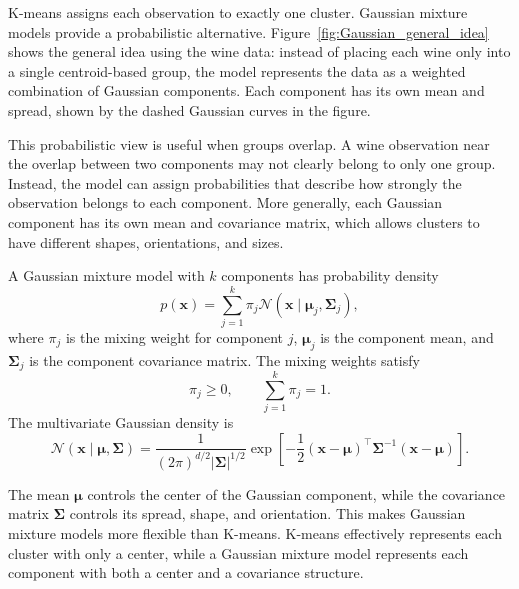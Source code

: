 \documentclass[12pt,letter]{article}
\begin{document}
K-means assigns each observation to exactly one cluster. Gaussian mixture models provide a probabilistic alternative. Figure~\ref{fig:Gaussian_general_idea} shows the general idea using the wine data: instead of placing each wine only into a single centroid-based group, the model represents the data as a weighted combination of Gaussian components. Each component has its own mean and spread, shown by the dashed Gaussian curves in the figure.

This probabilistic view is useful when groups overlap. A wine observation near the overlap between two components may not clearly belong to only one group. Instead, the model can assign probabilities that describe how strongly the observation belongs to each component. More generally, each Gaussian component has its own mean and covariance matrix, which allows clusters to have different shapes, orientations, and sizes.

A Gaussian mixture model with \(k\) components has probability density
\begin{equation}
    p(\mathbf{x})
    =
    \sum_{j=1}^{k}
    \pi_j
    \mathcal{N}
    \left(
        \mathbf{x}
        \mid
        \boldsymbol{\mu}_j,
        \boldsymbol{\Sigma}_j
    \right),
    \label{eq:gmm_density}
\end{equation}
where \(\pi_j\) is the mixing weight for component \(j\), \(\boldsymbol{\mu}_j\) is the component mean, and \(\boldsymbol{\Sigma}_j\) is the component covariance matrix. The mixing weights satisfy
\begin{equation}
    \pi_j \geq 0,
    \qquad
    \sum_{j=1}^{k}\pi_j=1.
\end{equation}
The multivariate Gaussian density is
\begin{equation}
    \mathcal{N}
    \left(
        \mathbf{x}
        \mid
        \boldsymbol{\mu},
        \boldsymbol{\Sigma}
    \right)
    =
    \frac{1}
    {(2\pi)^{d/2}|\boldsymbol{\Sigma}|^{1/2}}
    \exp
    \left[
        -\frac{1}{2}
        (\mathbf{x}-\boldsymbol{\mu})^\top
        \boldsymbol{\Sigma}^{-1}
        (\mathbf{x}-\boldsymbol{\mu})
    \right].
\end{equation}

The mean \(\boldsymbol{\mu}\) controls the center of the Gaussian component, while the covariance matrix \(\boldsymbol{\Sigma}\) controls its spread, shape, and orientation. This makes Gaussian mixture models more flexible than K-means. K-means effectively represents each cluster with only a center, while a Gaussian mixture model represents each component with both a center and a covariance structure.
\end{document}
